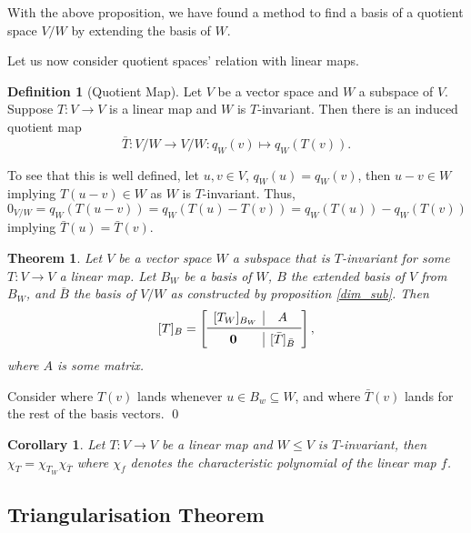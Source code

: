 \documentclass[
]{article}
\newtheorem{theorem}{Theorem}
\newtheorem{corollary}{Corollary}[theorem]
\theoremstyle{definition}
\newtheorem{definition}{Definition}[section]
\begin{document}
With the above proposition, we have found a method to find a basis of a
quotient space \(V / W\) by extending the basis of \(W\).

Let us now consider quotient spaces' relation with linear maps.

\begin{definition}[Quotient Map]
  Let \(V\) be a vector space and \(W\) a subspace of \(V\). Suppose 
  \(T : V \to V\) is a linear map and \(W\) is \(T\)-invariant. Then there 
  is an induced quotient map 
  \[\bar{T} : V / W \to V / W : q_W(v) \mapsto q_W(T(v)).\]
\end{definition}

To see that this is well defined, let \(u, v \in V\),
\(q_W(u) = q_W(v)\), then \(u - v \in W\) implying \(T(u - v) \in W\) as
\(W\) is \(T\)-invariant. Thus,
\(0_{V / W} = q_W(T(u - v)) = q_W(T(u) - T(v)) = q_W(T(u)) - q_W(T(v))\)
implying \(\bar{T}(u) = \bar{T}(v)\).

\begin{theorem}\label{blocks_quotient}
  Let \(V\) be a vector space \(W\) a subspace that is \(T\)-invariant for some 
  \(T : V \to V\) a linear map. Let \(B_W\) be a basis of \(W\), \(B\) the 
  extended basis of \(V\) from \(B_W\), and \(\bar{B}\) the basis of \(V / W\) 
  as constructed by proposition \ref{dim_sub}. Then 
  \[[T]_B = 
    \left[
    \begin{array}{c|c}
      [T_W]_{B_W} & A \\
      \midrule
      \mathbf{0} & [\bar{T}]_{\bar{B}}
    \end{array}
    \right],
  \]
  where \(A\) is some matrix.
\end{theorem}
\proof

Consider where \(T(v)\) lands whenever \(u \in B_w \subseteq W\), and
where \(\bar{T}(v)\) lands for the rest of the basis vectors. \qed

\begin{corollary}\label{prod_char}
  Let \(T : V \to V\) be a linear map and \(W \le V\) is \(T\)-invariant, 
  then \(\chi_T = \chi_{T_W} \chi_{\bar{T}}\) where \(\chi_f\) denotes the 
  characteristic polynomial of the linear map \(f\). 
\end{corollary}

\hypertarget{triangularisation-theorem}{%
\subsection{Triangularisation Theorem}\label{triangularisation-theorem}}
\end{document}
